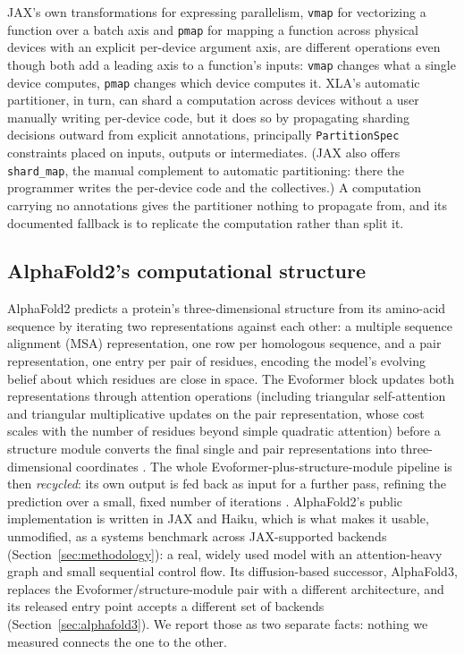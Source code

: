 JAX's own transformations for expressing
parallelism, \texttt{vmap} for vectorizing a function over a batch axis
and \texttt{pmap} for mapping a function across physical devices with
an explicit per-device argument axis, are different operations even
though both add a leading axis to a function's inputs: \texttt{vmap}
changes what a single device computes, \texttt{pmap} changes which
device computes it. XLA's automatic partitioner, in turn, can shard a
computation across devices
without a user manually writing per-device code, but it does so by
propagating sharding decisions outward from explicit annotations,
principally \texttt{PartitionSpec} constraints placed on inputs,
outputs or intermediates. (JAX also offers \texttt{shard\_map}, the
manual complement to automatic partitioning: there the programmer
writes the per-device code and the collectives.) A computation carrying no annotations gives the partitioner
nothing to propagate from, and its documented fallback is to replicate
the computation rather than split it.

\subsection{AlphaFold2's computational structure}
\label{sec:background-af2}

AlphaFold2 predicts a protein's three-dimensional structure from its
amino-acid sequence by iterating two representations against each
other: a multiple sequence alignment (MSA) representation, one row per
homologous sequence, and a pair representation, one entry per pair of
residues, encoding the model's evolving belief about which residues
are close in space. The Evoformer block updates both representations
through attention operations (including triangular self-attention and
triangular multiplicative updates on the pair representation, whose
cost scales with the number of residues beyond simple quadratic
attention) before a structure module converts the final single and pair
representations into three-dimensional coordinates
\citep{jumper2021alphafold}. The whole Evoformer-plus-structure-module
pipeline is then \emph{recycled}: its own output is fed back as input
for a further pass, refining the prediction over a small, fixed number
of iterations \citep{jumper2021alphafold}. AlphaFold2's public
implementation is written in JAX and Haiku, which is what makes it
usable, unmodified, as a systems benchmark across JAX-supported
backends (Section~\ref{sec:methodology}): a real, widely used model
with an attention-heavy graph and small sequential control flow.
Its diffusion-based successor,
AlphaFold3, replaces the Evoformer/structure-module pair with a
different architecture, and its released entry point accepts a
different set of backends (Section~\ref{sec:alphafold3}). We report
those as two separate facts: nothing we measured connects the one to
the other.

